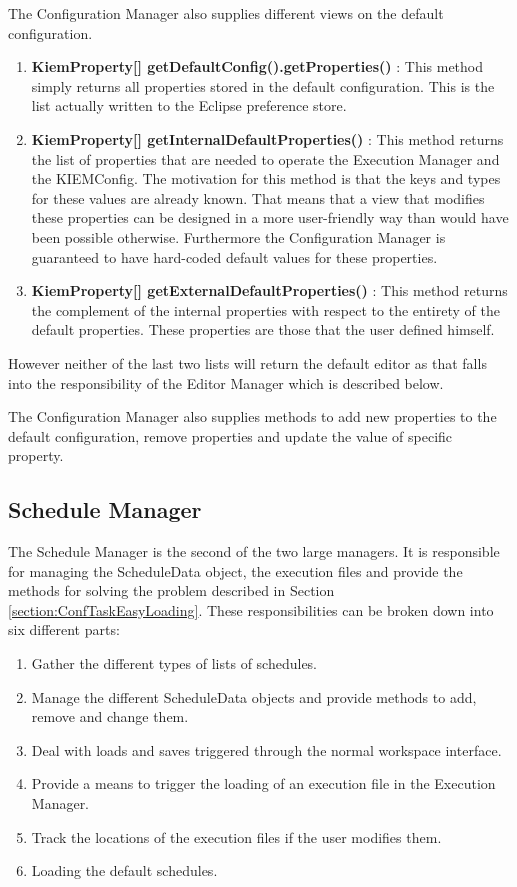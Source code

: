 The Configuration Manager also supplies different views on the default configuration. 
\begin{enumerate}
 \item \textbf{KiemProperty[] getDefaultConfig().getProperties()} : This method simply returns all properties
stored in the default configuration. This is the list actually written to the Eclipse preference store.
 \item \textbf{KiemProperty[] getInternalDefaultProperties()} : This method returns the list of properties that
are needed to operate the Execution Manager and the \ac{KIEMConfig}. The motivation for this method is that
the keys and types for these values are already known. That means that a view that modifies these properties
can be designed in a more user-friendly way than would have been possible otherwise. Furthermore the Configuration 
Manager is guaranteed to have hard-coded default values for these properties.
 \item \textbf{KiemProperty[] getExternalDefaultProperties()} : This method returns the complement of the internal
properties with respect to the entirety of the default properties. These properties are those that the user defined
himself.
\end{enumerate}
However neither of the last two lists will return the default editor as that falls into the responsibility of
the Editor Manager which is described below.

The Configuration Manager also supplies methods to add new properties to the default configuration, remove properties
and update the value of specific property.

\subsection{Schedule Manager}
\label{section:ScheduleManager}
The Schedule Manager is the second of the two large managers. It is responsible for managing the
ScheduleData object, the execution files and provide the methods for solving the problem described
in Section \ref{section:ConfTaskEasyLoading}. These responsibilities can be broken down into
six different parts:
\begin{enumerate}
 \item Gather the different types of lists of schedules.
 \item Manage the different ScheduleData objects and provide methods to add, remove and change
them.
 \item Deal with loads and saves triggered through the normal workspace interface.
 \item Provide a means to trigger the loading of an execution file in the Execution Manager.
 \item Track the locations of the execution files if the user modifies them.
 \item Loading the default schedules.
\end{enumerate}


